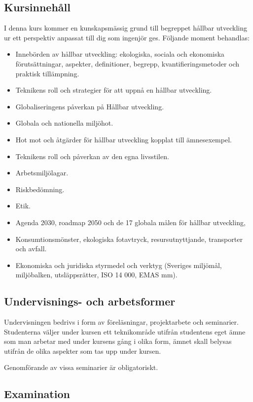 \subsection*{Kursinnehåll}

I denna kurs kommer en kunskapsmässig grund till begreppet hållbar
utveckling ur ett perspektiv anpassat till dig som ingenjör ges.
Följande moment behandlas:

\begin{itemize}
\tightlist
\item
  Innebörden av hållbar utveckling: ekologiska, sociala och ekonomiska
  förutsättningar, aspekter, definitioner, begrepp,
  kvantifieringsmetoder och praktisk tillämpning.
\item
  Teknikens roll och strategier för att uppnå en hållbar utveckling.
\item
  Globaliseringens påverkan på Hållbar utveckling.
\item
  Globala och nationella miljöhot.
\item
  Hot mot och åtgärder för hållbar utveckling kopplat till ämnesexempel.
\item
  Teknikens roll och påverkan av den egna livsstilen.
\item
  Arbetsmiljölagar.
\item
  Riskbedömning.
\item
  Etik.
\item
  Agenda 2030, roadmap 2050 och de 17 globala målen för hållbar
  utveckling,
\item
  Konsumtionsmönster, ekologiska fotavtryck, resursutnyttjande,
  transporter och avfall.
\item
  Ekonomiska och juridiska styrmedel och verktyg (Sveriges miljömål,
  miljöbalken, utsläppsrätter, ISO 14 000, EMAS mm).
\end{itemize}

\subsection*{Undervisnings- och
arbetsformer}

Undervisningen bedrivs i form av föreläsningar, projektarbete och
seminarier. Studenterna väljer under kursen ett teknikområde utifrån
studentens eget ämne som man arbetar med under kursens gång i olika
form, ämnet skall belysas utifrån de olika aspekter som tas upp under
kursen.

Genomförande av vissa seminarier är obligatoriskt.

\subsection*{Examination}

